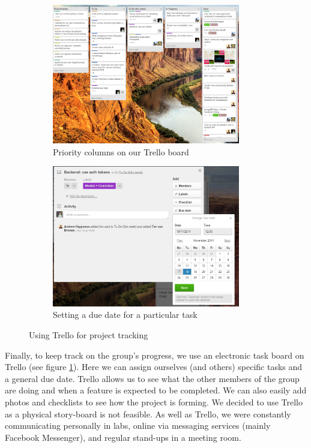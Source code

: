 \documentclass[a4paper, titlepage]{article}
\begin{document}
\begin{figure}[h!]
  \begin{subfigure}{0.5\textwidth}
    \centering
    \includegraphics[width = 0.9\textwidth]{./eval/trello-columns.png}
    \caption{Priority columns on our Trello board}
  \end{subfigure}
  \begin{subfigure}{0.5\textwidth}
    \centering
    \includegraphics[width = 0.9\textwidth]{./eval/trello-due-date.png}
    \caption{Setting a due date for a particular task}
  \end{subfigure}
  \caption{Using Trello for project tracking}
  \label{fig:eval_trello}
\end{figure}

Finally, to keep track on the group's progress, we use an electronic task
board on Trello (see figure \ref{fig:eval_trello}). Here we can assign ourselves (and others) specific tasks and a general due date. Trello allows us to see what the other members of the group are doing and when a feature is expected to be completed. We can also easily add photos and checklists to see how the project is forming. We decided to use Trello as a physical story-board is not feasible. As well as Trello, we were constantly communicating personally in labs, online via messaging services (mainly Facebook Messenger), and regular stand-ups in a meeting room.
\end{document}
